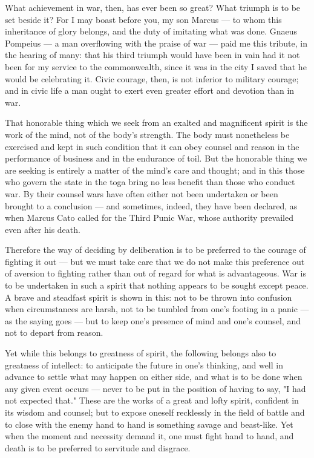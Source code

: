  What achievement in war, then, has ever been so great? What triumph is to be set beside it? For I may boast before you, my son Marcus — to whom this inheritance of glory belongs, and the duty of imitating what was done. Gnaeus Pompeius — a man overflowing with the praise of war — paid me this tribute, in the hearing of many: that his third triumph would have been in vain had it not been for my service to the commonwealth, since it was in the city I saved that he would be celebrating it. Civic courage, then, is not inferior to military courage; and in civic life a man ought to exert even greater effort and devotion than in war.

 That honorable thing which we seek from an exalted and magnificent spirit is the work of the mind, not of the body's strength. The body must nonetheless be exercised and kept in such condition that it can obey counsel and reason in the performance of business and in the endurance of toil. But the honorable thing we are seeking is entirely a matter of the mind's care and thought; and in this those who govern the state in the toga bring no less benefit than those who conduct war. By their counsel wars have often either not been undertaken or been brought to a conclusion — and sometimes, indeed, they have been declared, as when Marcus Cato called for the Third Punic War, whose authority prevailed even after his death.

 Therefore the way of deciding by deliberation is to be preferred to the courage of fighting it out — but we must take care that we do not make this preference out of aversion to fighting rather than out of regard for what is advantageous. War is to be undertaken in such a spirit that nothing appears to be sought except peace. A brave and steadfast spirit is shown in this: not to be thrown into confusion when circumstances are harsh, not to be tumbled from one's footing in a panic — as the saying goes — but to keep one's presence of mind and one's counsel, and not to depart from reason.

 Yet while this belongs to greatness of spirit, the following belongs also to greatness of intellect: to anticipate the future in one's thinking, and well in advance to settle what may happen on either side, and what is to be done when any given event occurs — never to be put in the position of having to say, "I had not expected that." These are the works of a great and lofty spirit, confident in its wisdom and counsel; but to expose oneself recklessly in the field of battle and to close with the enemy hand to hand is something savage and beast-like. Yet when the moment and necessity demand it, one must fight hand to hand, and death is to be preferred to servitude and disgrace.


